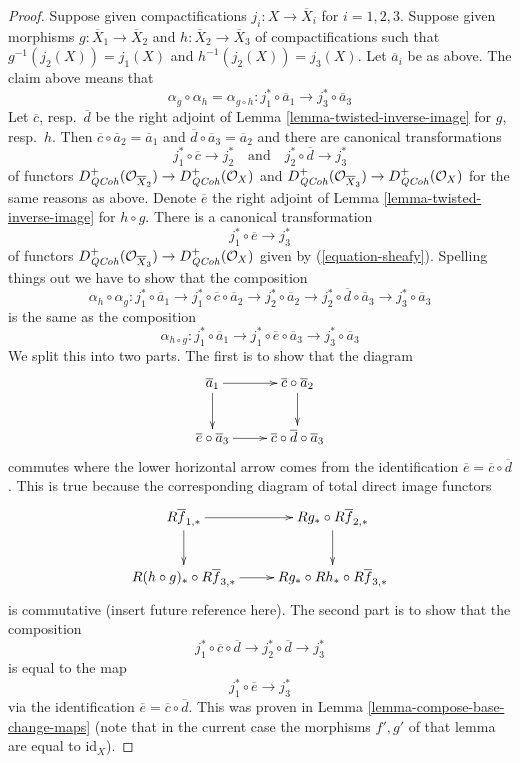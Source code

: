 \begin{proof}
\medskip\noindent
Suppose given compactifications $j_i : X \to \overline{X}_i$
for $i = 1, 2, 3$.  Suppose given morphisms
$g : \overline{X}_1 \to \overline{X}_2$ and
$h : \overline{X}_2 \to \overline{X}_3$ of compactifications
such that $g^{-1}(j_2(X)) = j_1(X)$ and $h^{-1}(j_2(X)) = j_3(X)$.
Let $\overline{a}_i$ be as above. The claim above means that
$$
\alpha_g \circ \alpha_h = \alpha_{g \circ h} :
j_1^* \circ \overline{a}_1 \to j_3^* \circ \overline{a}_3
$$
Let $\overline{c}$, resp.\ $\overline{d}$ be the right adjoint of
Lemma \ref{lemma-twisted-inverse-image} for $g$, resp.\ $h$.
Then $\overline{c} \circ \overline{a}_2 = \overline{a}_1$ and
$\overline{d} \circ \overline{a}_3 = \overline{a}_2$
and there are canonical transformations
$$
j_1^* \circ \overline{c} \longrightarrow j_2^*
\quad\text{and}\quad
j_2^* \circ \overline{d} \longrightarrow j_3^*
$$
of functors
$D^+_{\mathit{QCoh}}(\mathcal{O}_{\overline{X}_2}) \to D^+_{\mathit{QCoh}}(\mathcal{O}_X)$
and
$D^+_{\mathit{QCoh}}(\mathcal{O}_{\overline{X}_3}) \to D^+_{\mathit{QCoh}}(\mathcal{O}_X)$
for the same reasons as above. Denote $\overline{e}$ the
right adjoint of Lemma \ref{lemma-twisted-inverse-image}
for $h \circ g$. There is a canonical transformation
$$
j_1^* \circ \overline{e} \longrightarrow j_3^*
$$
of functors
$D^+_{\mathit{QCoh}}(\mathcal{O}_{\overline{X}_3}) \to D^+_{\mathit{QCoh}}(\mathcal{O}_X)$
given by (\ref{equation-sheafy}). Spelling things out we have to
show that the composition
$$
\alpha_h \circ \alpha_g :
j_1^* \circ \overline{a}_1 \to
j_1^* \circ \overline{c} \circ \overline{a}_2 \to
j_2^* \circ \overline{a}_2 \to
j_2^* \circ \overline{d} \circ \overline{a}_3 \to
j_3^* \circ \overline{a}_3
$$
is the same as the composition
$$
\alpha_{h \circ g} :
j_1^* \circ \overline{a}_1 \to
j_1^* \circ \overline{e} \circ \overline{a}_3 \to
j_3^* \circ \overline{a}_3
$$
We split this into two parts. The first is to show that the diagram
$$
\xymatrix{
\overline{a}_1 \ar[r] \ar[d] & \overline{c} \circ \overline{a}_2 \ar[d] \\
\overline{e} \circ \overline{a}_3 \ar[r] &
\overline{c} \circ \overline{d} \circ \overline{a}_3
}
$$
commutes where the lower horizontal arrow comes from the identification
$\overline{e} = \overline{c} \circ \overline{d}$. This is true
because the corresponding diagram of total direct image functors
$$
\xymatrix{
R\overline{f}_{1, *} \ar[r] \ar[d] & Rg_* \circ R\overline{f}_{2, *} \ar[d] \\
R(h \circ g)_* \circ R\overline{f}_{3, *} \ar[r] &
Rg_* \circ Rh_* \circ R\overline{f}_{3, *}
}
$$
is commutative (insert future reference here). The second part
is to show that the composition
$$
j_1^* \circ \overline{c} \circ \overline{d} \to
j_2^* \circ \overline{d} \to j_3^*
$$
is equal to the map
$$
j_1^* \circ \overline{e} \to j_3^*
$$
via the identification $\overline{e} = \overline{c} \circ \overline{d}$.
This was proven in Lemma \ref{lemma-compose-base-change-maps}
(note that in the current case the morphisms $f', g'$ of that
lemma are equal to $\text{id}_X$).
\end{proof}

